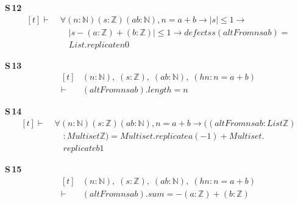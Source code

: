 \noindent\textbf{S\,12}\quad{}
{\footnotesize\[ \begin{aligned}[t]
\vdash\;&\forall (\mathit{n} : \mathbb{N} ) (\mathit{s} : \mathbb{Z} ) (\mathit{a} \mathit{b} : \mathbb{N} ), \mathit{n} = \mathit{a} + \mathit{b} \to |\mathit{s}| \leq 1 \to\\
&\quad |\mathit{s} - (\mathit{a}:\mathbb{Z} ) + (\mathit{b}:\mathbb{Z} )| \leq 1 \to \mathit{defects} \mathit{s} (\mathit{altFrom} \mathit{n} \mathit{s} \mathit{a} \mathit{b}) =\\
&\quad \mathit{List}.\mathit{replicate} \mathit{n} 0
\end{aligned} \]}

\noindent\textbf{S\,13}\quad{}
{\footnotesize\[ \begin{aligned}[t]
&(\mathit{n} : \mathbb{N} ),\; (\mathit{s} : \mathbb{Z} ),\; (\mathit{a} \mathit{b} : \mathbb{N} ),\; (\mathit{hn} : \mathit{n} = \mathit{a} + \mathit{b})\\
\vdash\;&(\mathit{altFrom} \mathit{n} \mathit{s} \mathit{a} \mathit{b}).\mathit{length} = \mathit{n}
\end{aligned} \]}

\noindent\textbf{S\,14}\quad{}
{\footnotesize\[ \begin{aligned}[t]
\vdash\;&\forall (\mathit{n} : \mathbb{N} ) (\mathit{s} : \mathbb{Z} ) (\mathit{a} \mathit{b} : \mathbb{N} ), \mathit{n} = \mathit{a} + \mathit{b} \to ((\mathit{altFrom} \mathit{n} \mathit{s} \mathit{a} \mathit{b} : \mathit{List} \mathbb{Z} )\\
&\quad : \mathit{Multiset} \mathbb{Z} ) = \mathit{Multiset}.\mathit{replicate} \mathit{a} (-1) + \mathit{Multiset}.\\
&\quad \mathit{replicate} \mathit{b} 1
\end{aligned} \]}

\noindent\textbf{S\,15}\quad{}
{\footnotesize\[ \begin{aligned}[t]
&(\mathit{n} : \mathbb{N} ),\; (\mathit{s} : \mathbb{Z} ),\; (\mathit{a} \mathit{b} : \mathbb{N} ),\; (\mathit{hn} : \mathit{n} = \mathit{a} + \mathit{b})\\
\vdash\;&(\mathit{altFrom} \mathit{n} \mathit{s} \mathit{a} \mathit{b}).\mathit{sum} = -(\mathit{a}:\mathbb{Z} ) + (\mathit{b}:\mathbb{Z} )
\end{aligned} \]}

